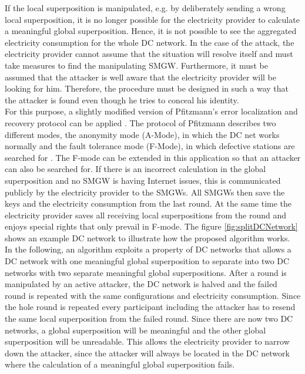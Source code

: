 If the local superposition is manipulated, e.g. by deliberately sending a wrong local superposition, it is no longer possible for the electricity provider to calculate a meaningful global superposition. Hence, it is not possible to see the aggregated electricity consumption for the whole DC network. In the case of the attack, the electricity provider cannot assume that the situation will resolve itself and must take measures to find the manipulating \gls{SMGW}. Furthermore, it must be assumed that the attacker is well aware that the electricity provider will be looking for him. Therefore, the procedure must be designed in such a way that the attacker is found even though he tries to conceal his identity.\\
For this purpose, a slightly modified version of Pfitzmann's error localization and recovery protocol can be applied \cite{pfitzmann2006security}. The protocol of Pfitzmann describes two different modes, the anonymity mode (A-Mode), in which the DC net works normally and the fault tolerance mode (F-Mode), in which defective stations are searched for .
The F-mode can be extended in this application so that an attacker can also be searched for. If there is an incorrect calculation in the global superposition and no \gls{SMGW} is having Internet issues, this is communicated publicly by the electricity provider to the \gls{SMGW}s. All \gls{SMGW}s then save the keys and the electricity consumption from the last round. At the same time the electricity provider saves all receiving local superpositions from the round and enjoys special rights that only prevail in F-mode. The figure \ref{fig:splitDCNetwork} shows an example DC network to illustrate how the proposed algorithm works.\\
In the following, an algorithm exploits a property of DC networks that allows a DC network with one meaningful global superposition to separate into two DC networks with two separate meaningful global superpositions.
After a round is manipulated by an active attacker, the DC network is halved and the failed round is repeated with the same configurations and electricity consumption. Since the hole round is repeated every participant including the attacker has to resend the same local superposition from the failed round. Since there are now two DC networks, a global superposition will be meaningful and the other global superposition will be unreadable. 
This allows the electricity provider to narrow down the attacker, since the attacker will always be located in the DC network where the calculation of a meaningful global superposition fails.\\
